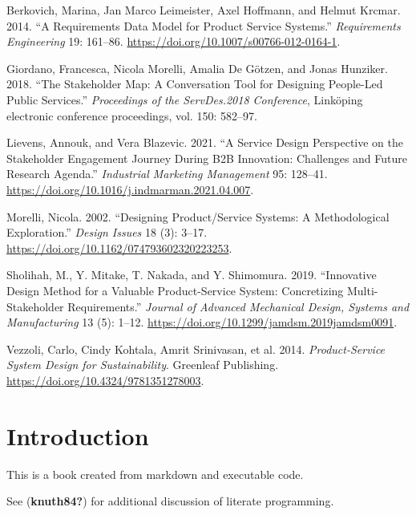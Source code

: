 \documentclass[
  letterpaper,
  DIV=11,
  numbers=noendperiod]{scrreprt}
\newlength{\cslhangindent}
\newenvironment{CSLReferences}[2] %
 {\begin{list}{}{%
  \setlength{\itemindent}{0pt}
  \setlength{\leftmargin}{0pt}
  \setlength{\parsep}{0pt}
  \ifodd #1
   \setlength{\leftmargin}{\cslhangindent}
   \setlength{\itemindent}{-1\cslhangindent}
  \fi
  \setlength{\itemsep}{#2\baselineskip}}}
 {\end{list}}
\begin{document}
\protect{}\label{refs}
\begin{CSLReferences}{1}{1}
Berkovich, Marina, Jan Marco Leimeister, Axel Hoffmann, and Helmut
Krcmar. 2014. {``A Requirements Data Model for Product Service
Systems.''} \emph{Requirements Engineering} 19: 161--86.
\url{https://doi.org/10.1007/s00766-012-0164-1}.

Giordano, Francesca, Nicola Morelli, Amalia De Götzen, and Jonas
Hunziker. 2018. {``The Stakeholder Map: A Conversation Tool for
Designing People-Led Public Services.''} \emph{Proceedings of the
ServDes.2018 Conference}, Linköping electronic conference proceedings,
vol. 150: 582--97.

Lievens, Annouk, and Vera Blazevic. 2021. {``A Service Design
Perspective on the Stakeholder Engagement Journey During B2B Innovation:
Challenges and Future Research Agenda.''} \emph{Industrial Marketing
Management} 95: 128--41.
\url{https://doi.org/10.1016/j.indmarman.2021.04.007}.

Morelli, Nicola. 2002. {``Designing Product/Service Systems: A
Methodological Exploration.''} \emph{Design Issues} 18 (3): 3--17.
\url{https://doi.org/10.1162/074793602320223253}.

Sholihah, M., Y. Mitake, T. Nakada, and Y. Shimomura. 2019.
{``Innovative Design Method for a Valuable Product-Service System:
Concretizing Multi-Stakeholder Requirements.''} \emph{Journal of
Advanced Mechanical Design, Systems and Manufacturing} 13 (5): 1--12.
\url{https://doi.org/10.1299/jamdsm.2019jamdsm0091}.

Vezzoli, Carlo, Cindy Kohtala, Amrit Srinivasan, et al. 2014.
\emph{Product-Service System Design for Sustainability}. Greenleaf
Publishing. \url{https://doi.org/10.4324/9781351278003}.

\end{CSLReferences}


\chapter{Introduction}\label{introduction}

This is a book created from markdown and executable code.

See (\textbf{knuth84?}) for additional discussion of literate
programming.
\end{document}
